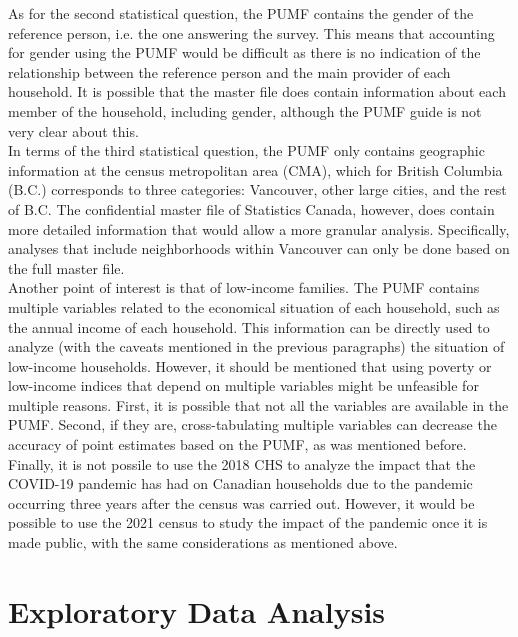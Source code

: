 \documentclass[11pt]{article}
\begin{document}
As for the second statistical question, the PUMF contains the gender
of the reference person, i.e. the one answering the survey.
This means that accounting for gender using the PUMF would be difficult
as there is no indication of the relationship between the reference person
and the main provider of each household. It is possible that the master file
does contain information about each member of the household, including gender,
although the PUMF guide is not very clear about this.
\\

In terms of the third statistical question, the PUMF only
contains geographic information at the census metropolitan area (CMA),
which for British Columbia (B.C.) corresponds to three categories:
Vancouver, other large cities, and the rest of B.C. The confidential
master file of Statistics Canada, however, does contain more detailed
information that would allow a more granular analysis.
Specifically, analyses that include neighborhoods within Vancouver can only
be done based on the full master file.
\\

Another point of interest is that of low-income families. The PUMF contains
multiple variables related to the economical situation of each household,
such as the annual income of each household. This information can be directly
used to analyze (with the caveats mentioned in the previous paragraphs)
the situation of low-income households. However, it should be mentioned that
using poverty or low-income indices that depend on multiple variables might
be unfeasible for multiple reasons. First, it is possible that not all the
variables are available in the PUMF. Second, if they are, cross-tabulating
multiple variables can decrease the accuracy of point estimates based on
the PUMF, as was mentioned before.
\\

Finally, it is not possile to use the 2018 CHS to analyze the impact that
the COVID-19 pandemic has had on Canadian households due to the pandemic
occurring three years after the census was carried out. However, it would
be possible to use the 2021 census to study the impact of the pandemic
once it is made public, with the same considerations as mentioned above.




\section{Exploratory Data Analysis} \label{sec:eda}
\end{document}
